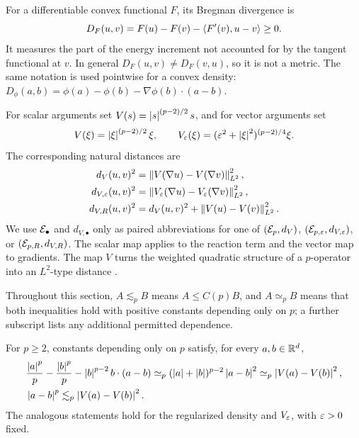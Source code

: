 For a differentiable convex functional \(F\), its Bregman divergence is
\begin{equation}
 D_F(u,v)=F(u)-F(v)-\left\langle F'(v),u-v\right\rangle\geq0.
 \label{eq:bregman-definition}
\end{equation}
It measures the part of the energy increment not accounted for by the tangent functional at \(v\). In
general \(D_F(u,v)\neq D_F(v,u)\), so it is not a metric. The same notation is used pointwise for a
convex density: \(D_\phi(a,b)=\phi(a)-\phi(b)-\nabla\phi(b)\cdot(a-b)\).

For scalar arguments set \(V(s)=\left\lvert s\right\rvert^{(p-2)/2}s\), and for vector arguments set
\[
 V(\xi)=\left\lvert \xi\right\rvert^{(p-2)/2}\xi,
 \qquad
 V_\varepsilon(\xi)=(\varepsilon^2+\left\lvert \xi\right\rvert^2)^{(p-2)/4}\xi.
\]
The corresponding natural distances are
\begin{align*}
 d_V(u,v)^2&=\left\lVert V(\nabla u)-V(\nabla v)\right\rVert_{L^2}^2,\\
 d_{V,\varepsilon}(u,v)^2&=\left\lVert V_\varepsilon(\nabla u)-V_\varepsilon(\nabla v)\right\rVert_{L^2}^2,\\
d_{V,R}(u,v)^2&=d_V(u,v)^2+
 \left\lVert V(u)-V(v)\right\rVert_{L^2}^2.
\end{align*}
We use \(\mathcal{E}_\bullet\) and \(d_{V,\bullet}\) only as paired abbreviations for one of
\((\mathcal{E}_p,d_V)\), \((\mathcal{E}_{p,\varepsilon},d_{V,\varepsilon})\), or \((\mathcal{E}_{p,R},d_{V,R})\). The scalar map applies to
the reaction term and the vector map to gradients. The map \(V\) turns the weighted quadratic
structure of a \(p\)-operator into an \(L^2\)-type distance
\citep{BarrettLiu1993,DieningKreuzer2008,LeePark2025}.

Throughout this section, \(A\lesssim_p B\) means \(A\leq C(p)B\), and \(A\simeq_p B\) means that
both inequalities hold with positive constants depending only on \(p\); a further subscript lists
any additional permitted dependence.

\begin{lemma}
\label{lem:pstructure}
For \(p\geq2\), constants depending only on \(p\) satisfy, for every
\(a,b\in\mathbb{R}^d\),
\begin{align}
 &\frac{\left\lvert a\right\rvert^p}{p}-\frac{\left\lvert b\right\rvert^p}{p}
 -\left\lvert b\right\rvert^{p-2}b\cdot(a-b)
 \simeq_p(\left\lvert a\right\rvert+\left\lvert b\right\rvert)^{p-2}\left\lvert a-b\right\rvert^2
 \simeq_p\left\lvert V(a)-V(b)\right\rvert^2,
 \label{eq:pstructure}\\
 &\left\lvert a-b\right\rvert^p\lesssim_p\left\lvert V(a)-V(b)\right\rvert^2.
 \label{eq:pcontrol}
\end{align}
The analogous statements hold for the regularized density and \(V_\varepsilon\), with \(\varepsilon>0\) fixed.
\end{lemma}

